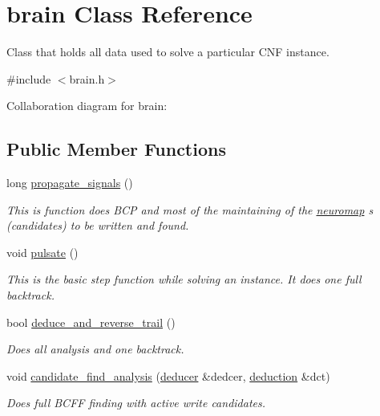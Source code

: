 \hypertarget{classbrain}{}\section{brain Class Reference}
\label{classbrain}


Class that holds all data used to solve a particular C\+NF instance.  




{\ttfamily \#include $<$brain.\+h$>$}



Collaboration diagram for brain\+:
\subsection*{Public Member Functions}
\begin{DoxyCompactItemize}
\item 
long \hyperlink{classbrain_a28eeaf513dd81fcb3dcb21fb37f58ccb}{propagate\+\_\+signals} ()
\begin{DoxyCompactList}\small\item\em This is function does B\+CP and most of the maintaining of the \hyperlink{classneuromap}{neuromap} s (candidates) to be written and found. \end{DoxyCompactList}\item 
void \hyperlink{classbrain_a9728a44b4e7b71ddb4a47bb25af05612}{pulsate} ()
\begin{DoxyCompactList}\small\item\em This is the basic step function while solving an instance. It does one full backtrack. \end{DoxyCompactList}\item 
bool \hyperlink{classbrain_a8d880c7f0e91a5dbb2cedaefdb704153}{deduce\+\_\+and\+\_\+reverse\+\_\+trail} ()
\begin{DoxyCompactList}\small\item\em Does all analysis and one backtrack. \end{DoxyCompactList}\item 
void \hyperlink{classbrain_a16dcda6892686c581ca095f51e6a9def}{candidate\+\_\+find\+\_\+analysis} (\hyperlink{classdeducer}{deducer} \&dedcer, \hyperlink{classdeduction}{deduction} \&dct)
\begin{DoxyCompactList}\small\item\em Does full B\+C\+FF finding with active write candidates. \end{DoxyCompactList}\item 

\end{DoxyCompactItemize}
